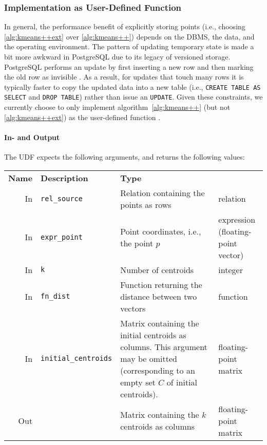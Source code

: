 \subsubsection{Implementation as User-Defined Function}

In general, the performance benefit of explicitly storing points (i.e., choosing \ref{alg:kmeans++ext} over \ref{alg:kmeans++}) depends on the DBMS, the data, and the operating environment. The pattern of updating temporary state is made a bit more awkward in PostgreSQL due to its legacy of versioned storage. PostgreSQL performs an update by first inserting a new row and then marking the old row as invisible \cite[Section~23.1.2]{postgres:9.1.3}. As a result, for updates that touch many rows it is typically faster to copy the updated data into a new table (i.e., \texttt{CREATE TABLE AS SELECT} and \texttt{DROP TABLE}) rather than issue an \texttt{UPDATE}. Given these constraints, we currently choose to only implement algorithm~\ref{alg:kmeans++} (but not \ref{alg:kmeans++ext}) as the user-defined function .

\paragraph{In- and Output} The UDF expects the following arguments, and returns the following values:

\begin{center}
	\begin{tabularx}{\textwidth}{rlXl}
		\toprule%
		\textbf{Name} & \textbf{Description} & \textbf{Type}
		\\\otoprule
		In &
		\texttt{rel\_source} &
		Relation containing the points as rows &
		relation
		\\\midrule
		In &
		\texttt{expr\_point} &
		Point coordinates, i.e., the point $p$ &
		\specialcell{l}{expression\\ (floating-point vector)}
		\\\midrule
		In &
		\texttt{k} &
		Number of centroids &
		integer
		\\\midrule
		In &
		\texttt{fn\_dist} &
		Function returning the distance between two vectors &
		function
		\\\midrule
		In &
		\texttt{initial\_centroids} &
		Matrix containing the initial centroids as columns. This argument may be omitted (corresponding to an empty set $C$ of initial centroids). &
		floating-point matrix
		\\\midrule
		Out &
		&
		Matrix containing the $k$ centroids as columns &
		floating-point matrix
		\\\bottomrule
	\end{tabularx}
\end{center}

